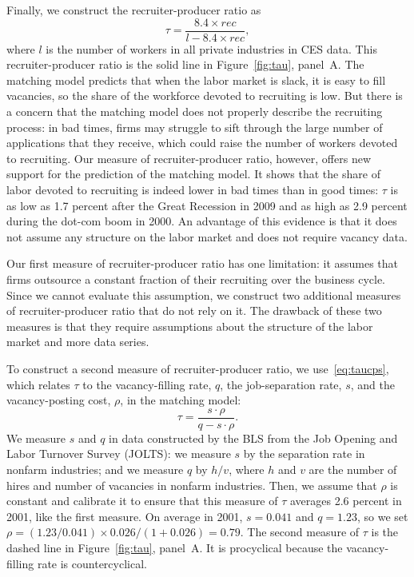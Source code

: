 \documentclass[letterpaper,12pt,leqno]{article}
\def \r{{\rho}}
\begin{document}
Finally, we construct the recruiter-producer ratio as
\begin{equation}
\tau=\frac{8.4 \times  rec}{l-8.4 \times rec},
\label{eq:tau1}\end{equation}
where $l$ is the number of workers in all private industries in CES data. This recruiter-producer ratio is the solid line in Figure~\ref{fig:tau}, panel~A. The matching model predicts that when the labor market is slack, it is easy to fill vacancies, so the share of the workforce devoted to recruiting is low. But there is a concern that the matching model does not properly describe the recruiting process: in bad times, firms may struggle to sift through the large number of applications that they receive, which could raise the number of workers devoted to recruiting. Our measure of recruiter-producer ratio, however, offers new support for the prediction of the matching model. It shows that the share of labor devoted to recruiting is indeed lower in bad times than in good times: $\tau$ is as low as 1.7 percent after the Great Recession in 2009 and as high as 2.9 percent during the dot-com boom in 2000. An advantage of this evidence is that it does not assume any structure on the labor market and does not require vacancy data.

Our first measure of recruiter-producer ratio has one limitation: it assumes that firms outsource a constant fraction of their recruiting over the business cycle. Since we cannot evaluate this assumption, we construct two additional measures of recruiter-producer ratio that do not rely on it. The drawback of these two measures is that they require assumptions about the structure of the labor market and more data series.

To construct a second measure of recruiter-producer ratio, we use~\eqref{eq:taucps}, which relates $\tau$ to the vacancy-filling rate, $q$, the job-separation rate, $s$, and the vacancy-posting cost, $\r$, in the matching model:
\begin{equation}
\tau= \frac{s\cdot\r}{q-s\cdot \r}.
\label{eq:tau2}\end{equation}
We measure $s$ and $q$ in data constructed by the BLS from the Job Opening and Labor Turnover Survey (JOLTS): we measure $s$ by the separation rate in nonfarm industries; and we measure $q$ by $h/v$, where $h$ and $v$ are the number of hires and number of vacancies in nonfarm industries. Then, we assume that $\r$ is constant and calibrate it to ensure that this measure of $\tau$ averages 2.6 percent in 2001, like the first measure. On average in 2001, $s=0.041$ and $q=1.23$, so we set $\r=(1.23/0.041)\times 0.026/(1+0.026)=0.79$. The second measure of $\tau$ is the dashed line in Figure~\ref{fig:tau}, panel~A. It is procyclical because the vacancy-filling rate is countercyclical. 
\end{document}
